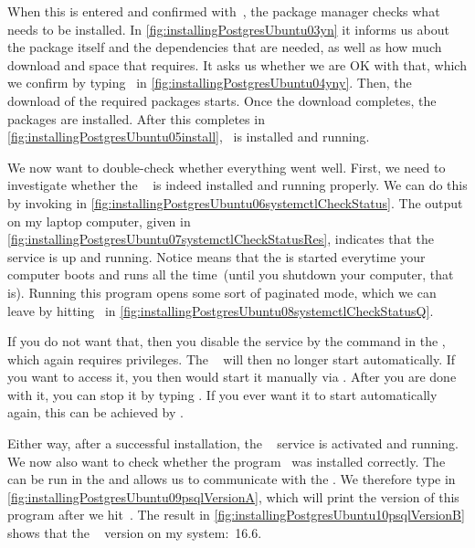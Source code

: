 When this is entered and confirmed with~\keys{\enter}, the package manager checks what needs to be installed.
In \cref{fig:installingPostgresUbuntu03yn} it informs us about the package itself and the dependencies that are needed, as well as how much download and space that requires.
It asks us whether we are OK with that, which we confirm by typing~ in \cref{fig:installingPostgresUbuntu04yny}.
Then, the download of the required packages starts.
Once the download completes, the packages are installed.
After this completes in \cref{fig:installingPostgresUbuntu05install}, \postgresql\ is installed and running.

We now want to double-check whether everything went well.
First, we need to investigate whether the \postgresql\   is indeed installed and running properly.
We can do this by invoking  in \cref{fig:installingPostgresUbuntu06systemctlCheckStatus}.
The output on my laptop computer, given in \cref{fig:installingPostgresUbuntu07systemctlCheckStatusRes}, indicates that the service is up and running.
Notice  means that the  is started everytime your computer boots and runs all the time~(until you shutdown your computer, that is).
Running this program opens some sort of paginated mode, which we can leave by hitting~ in \cref{fig:installingPostgresUbuntu08systemctlCheckStatusQ}.%
%
\begin{sloppypar}%
If you do not want that, then you disable the service by the command  in the , which again requires  privileges.
The \postgresql\  will then no longer start automatically.
If you want to access it, you then would start it manually via .
After you are done with it, you can stop it by typing .
If you ever want it to start automatically again, this can be achieved by .%
\end{sloppypar}%
%
Either way, after a successful installation, the \postgresql\  service is activated and running.
We now also want to check whether the  program \psql\ was installed correctly.
The  can be run in the  and allows us to communicate with the  .
We therefore type  in \cref{fig:installingPostgresUbuntu09psqlVersionA}, which will print the version of this program after we hit~\keys{\enter}.
The result in \cref{fig:installingPostgresUbuntu10psqlVersionB} shows that the \psql\  version on my system:~16.6.

